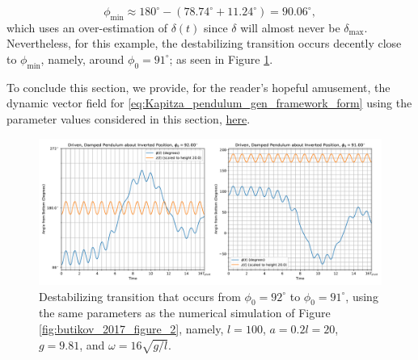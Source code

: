 \documentclass[12pt, letterpaper]{article}
\begin{document}
\begin{equation}
    \phi_{\mathrm{min}} \approx 180^\circ - \left(78.74^\circ + 11.24^\circ\right) = 90.06^\circ,
\end{equation}
which uses an over-estimation of $\delta(t)$ since $\delta$ will almost never be $\delta_{\mathrm{max}}$. Nevertheless, for this example, the destabilizing transition occurs decently close to $\phi_{\mathrm{min}}$, namely, around $\phi_0 = 91^\circ$; as seen in Figure \ref{fig:ButikovKapitza2017Figure2_phi0_92_to_91}.
\par To conclude this section, we provide, for the reader's hopeful amusement, the dynamic vector field for \ref{eq:Kapitza_pendulum_gen_framework_form} using the parameter values considered in this section, \href{https://anvaka.github.io/fieldplay/?cx=-5.4424&cy=0.2769999999999999&w=6.611800000000001&h=6.611800000000001&dt=0.005&fo=0.998&dp=0.009&cm=2&vf=vec2%20get_velocity%28vec2%20p%29%20%7B%0A%20%20vec2%20v%20%3D%20vec2%280.%2C%200.%29%3B%0A%20%20float%20g%20%3D%209.81%3B%0A%20%20float%20l%20%3D%20100.0%3B%0A%20%20float%20omega_0%20%3D%20sqrt%28g%2Fl%29%3B%0A%20%20float%20gamma%20%3D%20omega_0%20%2F%2010.0%3B%0A%20%20float%20a%20%3D%200.2*l%3B%0A%20%20float%20omega%20%3D%2016.0*sqrt%28g%2Fl%29%3B%0A%20%20float%20t%20%3D%20frame%2F100.0%3B%0A%20%20%2F%2F%20float%20t%20%3D%201.0%3B%0A%0A%20%20v.x%20%3D%20p.y%3B%0A%20%20v.y%20%3D%20-2.0*gamma*p.y%20-%20%28%28g%2Fl%29-%28a%2Fl%29*omega*omega*cos%28omega*t%29%29*sin%28p.x%29%3B%0A%20%20return%20v%3B%0A%7D&code=vec2%20get_velocity%28vec2%20p%29%20%7B%0A%20%20vec2%20v%20%3D%20vec2%280.%2C%200.%29%3B%0A%20%20float%20g%20%3D%209.81%3B%0A%20%20float%20l%20%3D%20100.0%3B%0A%20%20float%20omega_0%20%3D%20sqrt%28g%2Fl%29%3B%0A%20%20float%20gamma%20%3D%20omega_0%20%2F%2010.0%3B%0A%20%20float%20a%20%3D%200.2*l%3B%0A%20%20float%20omega%20%3D%2016.0*sqrt%28g%2Fl%29%3B%0A%20%20float%20t%20%3D%20frame%2F100.0%3B%0A%20%20%2F%2F%20float%20t%20%3D%201.0%3B%0A%0A%20%20v.x%20%3D%20p.y%3B%0A%20%20v.y%20%3D%20-2.0*gamma*p.y%20-%20%28%28g%2Fl%29-%28a%2Fl%29*omega*omega*cos%28omega*t%29%29*sin%28p.x%29%3B%0A%20%20return%20v%3B%0A%7D&pc=100000}{here}.

\begin{figure}
    \centering
    \includegraphics[width=\linewidth]{ButikovKapitza2017Figure2_phi0_92_to_91.pdf}
    \caption{Destabilizing transition that occurs from $\phi_0 = 92^\circ$ to $\phi_0 = 91^\circ$, using the same parameters as the numerical simulation of Figure \ref{fig:butikov_2017_figure_2}, namely, $l = 100$, $a = 0.2l = 20$, $g = 9.81$, and $\omega = 16\sqrt{g/l}$.}
    \label{fig:ButikovKapitza2017Figure2_phi0_92_to_91}
\end{figure}
\end{document}
